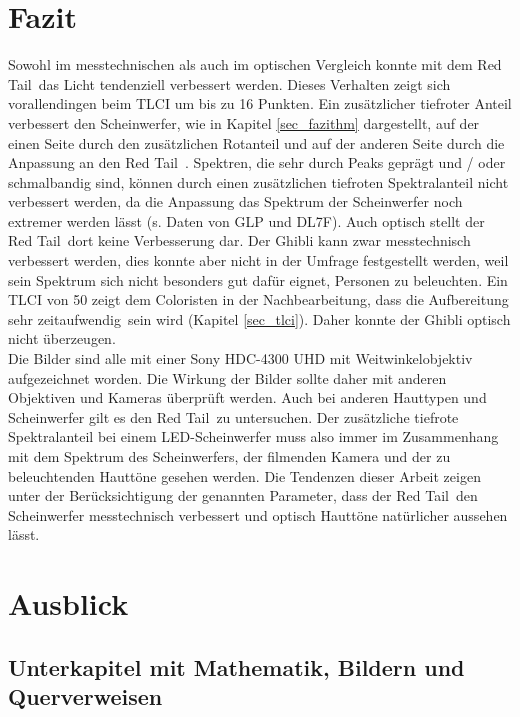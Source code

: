 \chapter{Fazit}
Sowohl im messtechnischen als auch im optischen Vergleich konnte mit dem \glqq Red Tail\grqq\ das Licht tendenziell verbessert werden. Dieses Verhalten zeigt sich vorallendingen beim TLCI um bis zu 16 Punkten. Ein zusätzlicher tiefroter Anteil verbessert den Scheinwerfer, wie in Kapitel \ref{sec_fazithm} dargestellt, auf der einen Seite durch den zusätzlichen Rotanteil und auf der anderen Seite durch die Anpassung an den \glqq Red Tail\grqq\ . Spektren, die sehr durch Peaks geprägt und / oder schmalbandig sind, können durch einen zusätzlichen tiefroten Spektralanteil nicht verbessert werden, da die Anpassung das Spektrum der Scheinwerfer noch extremer werden lässt (s. Daten von GLP und DL7F). Auch optisch stellt der \glqq Red Tail\grqq\ dort keine Verbesserung dar. Der Ghibli kann zwar messtechnisch verbessert werden, dies konnte aber nicht in der Umfrage festgestellt werden, weil sein Spektrum sich nicht besonders gut dafür eignet, Personen zu beleuchten. Ein TLCI von 50 zeigt dem Coloristen in der Nachbearbeitung, dass die \glqq Aufbereitung sehr zeitaufwendig\grqq\ sein wird (Kapitel \ref{sec_tlci}). Daher konnte der Ghibli optisch nicht überzeugen.\\
Die Bilder sind alle mit einer Sony HDC-4300 UHD mit Weitwinkelobjektiv aufgezeichnet worden. Die Wirkung der Bilder sollte daher mit anderen Objektiven und Kameras überprüft werden. Auch bei anderen Hauttypen und Scheinwerfer gilt es den \glqq Red Tail\grqq\ zu untersuchen. Der zusätzliche tiefrote Spektralanteil bei einem LED-Scheinwerfer muss also immer im Zusammenhang mit dem Spektrum des Scheinwerfers, der filmenden Kamera und der zu beleuchtenden Hauttöne gesehen werden. Die Tendenzen dieser Arbeit zeigen unter der Berücksichtigung der genannten Parameter, dass der \glqq Red Tail\grqq\ den Scheinwerfer messtechnisch verbessert und optisch Hauttöne natürlicher aussehen lässt.

  


\chapter{Ausblick}

\section{Unterkapitel mit Mathematik, Bildern und Querverweisen}





